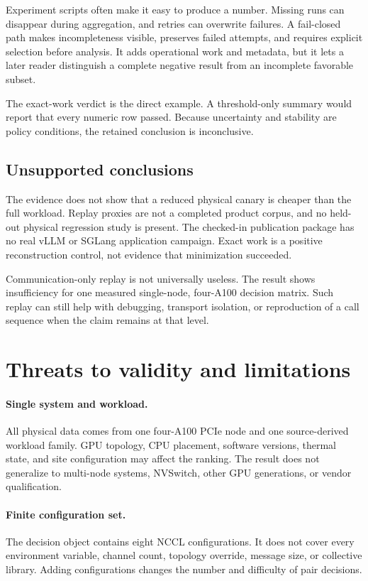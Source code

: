 \documentclass[10pt,twocolumn]{article}
\begin{document}
Experiment scripts often make it easy to produce a number. Missing runs can
disappear during aggregation, and retries can overwrite failures. A fail-closed
path makes incompleteness visible, preserves failed attempts, and requires
explicit selection before analysis. It adds operational work and metadata, but
it lets a later reader distinguish a complete negative result from an
incomplete favorable subset.

The exact-work verdict is the direct example. A threshold-only summary would
report that every numeric row passed. Because uncertainty and stability are
policy conditions, the retained conclusion is inconclusive.

\subsection{Unsupported conclusions}

The evidence does not show that a reduced physical canary is cheaper than the
full workload. Replay proxies are not a completed product corpus, and no
held-out physical regression study is present. The checked-in publication
package has no real vLLM or SGLang application campaign. Exact work is a
positive reconstruction control, not evidence that minimization succeeded.

Communication-only replay is not universally useless. The result shows
insufficiency for one measured single-node, four-A100 decision matrix. Such
replay can still help with debugging, transport isolation, or reproduction of a
call sequence when the claim remains at that level.

\section{Threats to validity and limitations}

\paragraph{Single system and workload.} All physical data comes from one
four-A100 PCIe node and one source-derived workload family. GPU topology, CPU
placement, software versions, thermal state, and site configuration may affect
the ranking. The result does not generalize to multi-node systems, NVSwitch,
other GPU generations, or vendor qualification.

\paragraph{Finite configuration set.} The decision object contains eight NCCL
configurations. It does not cover every environment variable, channel count,
topology override, message size, or collective library. Adding configurations
changes the number and difficulty of pair decisions.
\end{document}
